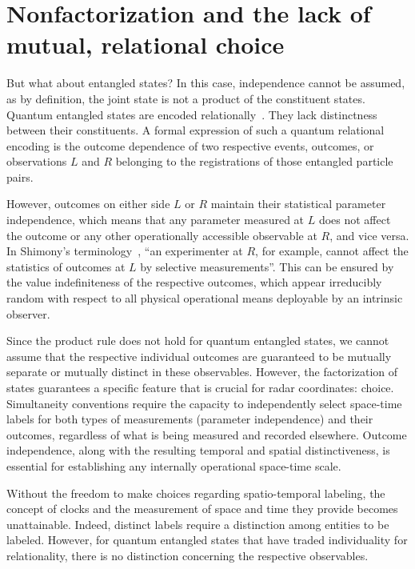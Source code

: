 \documentclass[%
  reprint,
 showpacs,
 showkeys,
 preprintnumbers,
 nofootinbib,
 amsmath,amssymb,
 aps,
 pra,
  longbibliography,
 ]{revtex4-2}
\begin{document}
\section{Nonfactorization and the lack of mutual, relational choice}

But what about entangled states? In this case, independence cannot be assumed, as
by definition, the joint state is not a product of the constituent states.
Quantum entangled states are encoded relationally~\cite{schrodinger-gwsidqm2,zeil-99,zeil-Zuk-bruk-01}.
They lack distinctness between their constituents.
A formal expression of such a quantum relational encoding is the outcome dependence
of two respective events, outcomes, or observations $L$ and $R$ belonging to the registrations of those entangled particle pairs.

However, outcomes on either side $L$ or $R$ maintain their statistical parameter independence,
which means that any parameter measured at $L$ does not affect the outcome
or any other operationally accessible observable at $R$, and vice versa.
In Shimony's terminology~\cite{shimony2,shimony_1993}, ``an experimenter
at $R$, for example, cannot affect the statistics of outcomes at $L$ by selective measurements''.
This can be ensured by the value indefiniteness of the respective outcomes, which appear irreducibly random
with respect to all physical operational means deployable by an intrinsic observer.


Since the product rule does not hold for quantum entangled states, we cannot assume that the respective individual outcomes
are guaranteed to be mutually separate or mutually distinct in these observables.
However, the factorization of states guarantees a specific feature that is crucial for radar coordinates: choice.
Simultaneity conventions require the capacity to independently select space-time labels for both types of measurements (parameter independence) and their outcomes,
regardless of what is being measured and recorded elsewhere.
Outcome independence, along with the resulting temporal and spatial distinctiveness,
is essential for establishing any internally operational space-time scale.

Without the freedom to make choices regarding spatio-temporal labeling,
the concept of clocks and the measurement of space and time they provide becomes unattainable.
Indeed, distinct labels require a distinction among entities to be labeled.
However, for quantum entangled states that have traded individuality for relationality,
there is no distinction concerning the respective observables.
\end{document}
